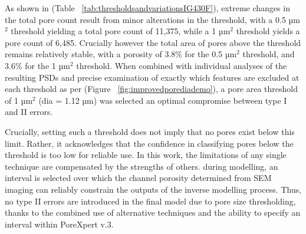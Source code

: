 \documentclass[3p,twocolumn]{elsarticle}
\begin{document}
  As shown in (Table ~\ref{tab:thresholdsandvariationsIG430F}), extreme changes
  in the total pore count result from minor alterations in the threshold, with a
  0.5 µm\(^2\) threshold yielding a total pore count of 11,375, while a 1
  µm\(^2\) threshold yields a pore count of 6,485. Crucially however the total
  area of pores above the threshold remains relatively stable, with a porosity
  of 3.8\% for the 0.5 µm\(^2\) threshold, and 3.6\% for the 1 µm\(^2\)
  threshold. When combined with individual analyses of the resulting PSDs and
  precise examination of exactly which features are excluded at each threshold
  as per (Figure ~\ref{fig:improvedporediademo}), a pore area threshold of 1
  µm\(^2\) (dia = 1.12 µm) was selected an optimal compromise between type I and
  II errors.

   Crucially, setting such a threshold does not imply that no pores exist below
   this limit. Rather, it acknowledges that the confidence in classifying pores
   below the threshold is too low for reliable use. In this work, the
   limitations of any single technique are compensated by the strengths of
   others. during modelling, an interval is selected over which the channel
   porosity determined from SEM imaging can reliably constrain the outputs of
   the inverse modelling process. Thus, no type II errors are introduced in the
   final model due to pore size thresholding, thanks to the combined use of
   alternative techniques and the ability to specify an interval within
   PoreXpert v.3.

   \begin{table}
  \centering
  \caption{Effect of different pore area thresholds on a subsection of IG-430F, showing the resulting pore count, total area, average pore size, and percentage area.}
  \label{tab:thresholdsandvariationsIG430F}
\end{table}
\end{document}
